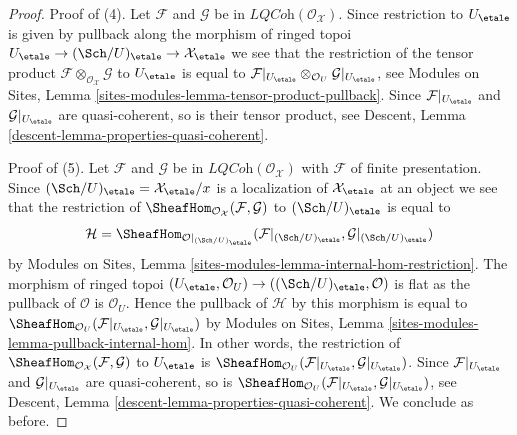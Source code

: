\begin{proof}
\medskip\noindent
Proof of (4). Let $\mathcal{F}$ and $\mathcal{G}$ be in
$\textit{LQCoh}(\mathcal{O}_\mathcal{X})$. Since restriction to $U_\etale$
is given by pullback along the morphism of ringed topoi
$U_\etale \to (\Sch/U)_\etale \to \mathcal{X}_\etale$
we see that the restriction of the tensor product
$\mathcal{F} \otimes_{\mathcal{O}_\mathcal{X}} \mathcal{G}$
to $U_\etale$ is equal to
$\mathcal{F}|_{U_\etale} \otimes_{\mathcal{O}_U} \mathcal{G}|_{U_\etale}$,
see Modules on Sites, Lemma \ref{sites-modules-lemma-tensor-product-pullback}.
Since $\mathcal{F}|_{U_\etale}$ and $\mathcal{G}|_{U_\etale}$
are quasi-coherent, so is their tensor product, see
Descent, Lemma \ref{descent-lemma-properties-quasi-coherent}.

\medskip\noindent
Proof of (5). Let $\mathcal{F}$ and $\mathcal{G}$ be in
$\textit{LQCoh}(\mathcal{O}_\mathcal{X})$ with $\mathcal{F}$
of finite presentation. Since
$(\Sch/U)_\etale = \mathcal{X}_\etale/x$
is a localization of $\mathcal{X}_\etale$ at an object
we see that the restriction of
$\SheafHom_{\mathcal{O}_\mathcal{X}}(\mathcal{F}, \mathcal{G})$
to $(\Sch/U)_\etale$ is equal to
$$
\mathcal{H} =
\SheafHom_{\mathcal{O}|_{(\Sch/U)_\etale}}(
\mathcal{F}|_{(\Sch/U)_\etale}, \mathcal{G}|_{(\Sch/U)_\etale})
$$
by Modules on Sites, Lemma \ref{sites-modules-lemma-internal-hom-restriction}.
The morphism of ringed topoi
$(U_\etale, \mathcal{O}_U) \to ((\Sch/U)_\etale, \mathcal{O})$
is flat as the pullback of $\mathcal{O}$ is $\mathcal{O}_U$.
Hence the pullback of $\mathcal{H}$ by this morphism is equal to
$\SheafHom_{\mathcal{O}_U}(\mathcal{F}|_{U_\etale}, \mathcal{G}|_{U_\etale})$
by Modules on Sites, Lemma \ref{sites-modules-lemma-pullback-internal-hom}.
In other words, the restriction of
$\SheafHom_{\mathcal{O}_\mathcal{X}}(\mathcal{F}, \mathcal{G})$
to $U_\etale$ is
$\SheafHom_{\mathcal{O}_U}(\mathcal{F}|_{U_\etale}, \mathcal{G}|_{U_\etale})$.
Since $\mathcal{F}|_{U_\etale}$ and $\mathcal{G}|_{U_\etale}$
are quasi-coherent, so is
$\SheafHom_{\mathcal{O}_U}(\mathcal{F}|_{U_\etale}, \mathcal{G}|_{U_\etale})$,
see Descent, Lemma \ref{descent-lemma-properties-quasi-coherent}.
We conclude as before.
\end{proof}
